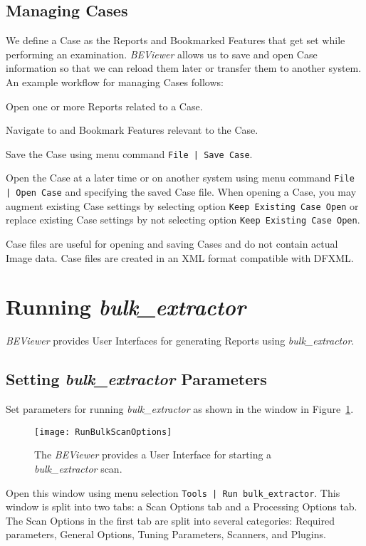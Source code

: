\documentclass[10pt,twoside]{article}
\newcommand{\bulk}{\emph{bulk\_extractor}\xspace}
\newcommand{\bev}{\emph{BEViewer}\xspace}
\begin{document}
\subsection{Managing Cases}
We define a Case as the Reports and Bookmarked Features that get set
while performing an examination.
\bev allows us to save and open Case information
so that we can reload them later
or transfer them to another system.
An example workflow for managing Cases follows:
\begin{compactenum}
\item Open one or more Reports related to a Case.
\item Navigate to and Bookmark Features relevant to the Case.
\item Save the Case using menu command \texttt{File | Save Case}.
\item Open the Case at a later time or on another system
using menu command \texttt{File | Open Case}
and specifying the saved Case file.
When opening a Case,
you may augment existing Case settings by selecting option \texttt{Keep Existing Case Open}
or replace existing Case settings by not selecting option \texttt{Keep Existing Case Open}.
\end{compactenum}
Case files are useful for opening and saving Cases and do not contain actual Image data.
Case files are created in an XML format compatible with DFXML.

\section{Running \bulk\label{running-bulk-extractor}}
\bev provides User Interfaces for generating Reports using \bulk.
\subsection{Setting \bulk Parameters}
Set parameters for running \bulk
as shown in the window in Figure~\ref{run-bulk-scan-options}.
\begin{figure}
\center
\texttt{[image: RunBulkScanOptions]}
\caption{The \bev provides a User Interface for starting a \bulk scan.\label{run-bulk-scan-options}}
\end{figure}
Open this window using menu selection \texttt{Tools | Run bulk\_extractor}.
This window is split into two tabs: a Scan Options tab and a Processing Options tab.
The Scan Options in the first tab are split into several categories:
Required parameters, General Options, Tuning Parameters, Scanners, and Plugins.
\end{document}
